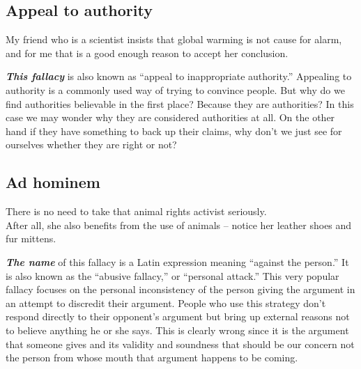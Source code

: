 \documentclass[12pt, openany]{book}
\begin{document}
\hypertarget{appeal-to-authority}{%
\subsection*{Appeal to authority}\label{appeal-to-authority}}


\begin{center}

\begin{argument}

My friend who is a scientist insists that global warming is not cause for alarm, and for me that is a good enough reason to accept her conclusion.

\end{argument}

\end{center}

\textbf{\emph{This fallacy}} is also known as ``appeal to inappropriate authority.'' Appealing to authority is a commonly used way of trying to convince people. But why do we find authorities believable in the first place? Because they are authorities? In this case we may wonder why they are considered authorities at all. On the other hand if they have something to back up their claims, why don't we just see for ourselves whether they are right or not?

\hypertarget{ad-hominem}{%
\subsection*{Ad hominem}\label{ad-hominem}}


\begin{center}

\begin{argument}

There is no need to take that animal rights activist seriously.\\

After all, she also benefits from the use of animals -- notice her leather shoes and fur mittens.

\end{argument}

\end{center}

\textbf{\emph{The name}} of this fallacy is a Latin expression meaning ``against the person.'' It is also known as the ``abusive fallacy,'' or ``personal attack.'' This very popular fallacy focuses on the personal inconsistency of the person giving the argument in an attempt to discredit their argument. People who use this strategy don't respond directly to their opponent's argument but bring up external reasons not to believe anything he or she says. This is clearly wrong since it is the argument that someone gives and its validity and soundness that should be our concern not the person from whose mouth that argument happens to be coming.
\end{document}
